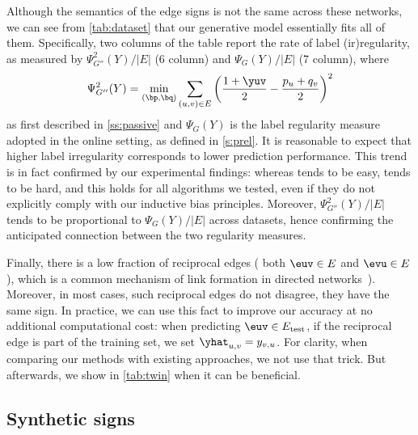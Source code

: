 Although the semantics of the edge signs is not the same across these networks, we can see from
\autoref{tab:dataset} that our generative model essentially fits all of them. Specifically,
two columns of the table report the rate of label (ir)regularity, as measured by
$\Psi^2_{G''}(Y)/|E|$ (6\thup{} column) and $\Psi_{G}(Y)/|E|$ (7\thup{} column), where 
\[
  \Psi^2_{G''}(Y) = \min_{(\bp,\bq)} \sum_{(u,v) \in E}
  \left(\frac{1+\yuv}{2} - \frac{p_u+q_v}{2} \right)^2
\]
as first described in \autoref{ss:passive}
and $\Psi_{G}(Y)$ is the
label regularity measure adopted in the online setting, as defined in \autoref{s:prel}. It is
reasonable to expect that higher label irregularity corresponds to lower prediction performance.
This trend is in fact confirmed by our experimental findings: whereas \epi{} tends to be easy,
\aut{} tends to be hard, and this holds for all algorithms we tested, even if they do not explicitly
comply with our inductive bias principles. Moreover, $\Psi^2_{G''}(Y)/|E|$ tends to be proportional
to $\Psi_{G}(Y)/|E|$ across datasets, hence confirming the anticipated connection between the two
regularity measures.

Finally, there is a low fraction of reciprocal edges (\ie{} both $\euv \in E$ and $\evu
\in E$), which is a common mechanism of link formation in directed
networks~\autocites{DirectedReciprocity04}{Reciprocity13}). Moreover, in most cases, such reciprocal edges do not disagree,
\ie{} they have the same sign. In practice, we can use this fact to improve our accuracy at no
additional computational cost: when predicting $\euv \in E_{\mathrm{test}}$, if the reciprocal edge
\evu{} is part of the training set, we set $\yhat_{u,v} = y_{v,u}$. For clarity, when comparing
our methods with existing approaches, we not use that trick. But afterwards, we show in
\autoref{tab:twin} when it can be beneficial.

\subsection{Synthetic signs}

